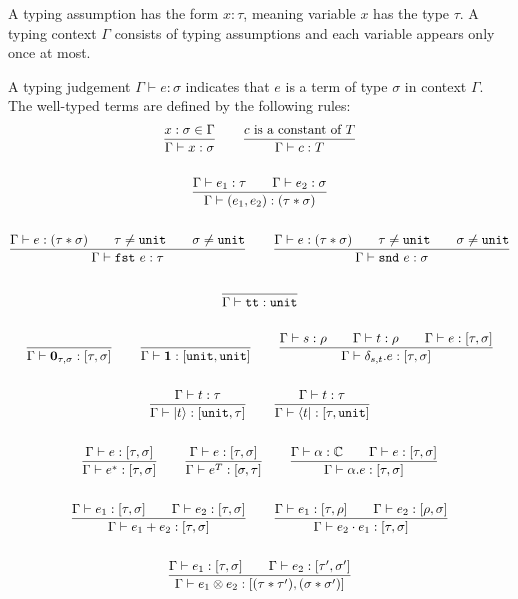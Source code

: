 \begin{definition}
  A typing assumption has the form $x : \tau$, meaning variable $x$ has the type $\tau$. A typing context $\Gamma$ consists of typing assumptions and each variable appears only once at most.

  A typing judgement $\Gamma \vdash e : \sigma$ indicates that $e$ is a term of type $\sigma$ in context $\Gamma$. The well-typed terms are defined by the following rules:
  \begin{gather*}
    \frac{x : \sigma \in \Gamma}{\Gamma \vdash x : \sigma}
    \qquad \frac{c\ \textrm{is a constant of}\ T}{\Gamma \vdash c : T}\\
    \\
    \frac{\Gamma \vdash e_1 : \tau \qquad \Gamma \vdash e_2 : \sigma}{\Gamma \vdash (e_1, e_2) : ( \tau * \sigma )} \\
    \\
    \frac{\Gamma \vdash e : ( \tau * \sigma ) \qquad \tau \neq \texttt{unit} \qquad \sigma \neq \texttt{unit}}{\Gamma \vdash \texttt{fst}\ e : \tau}
    \qquad
    \frac{\Gamma \vdash e : ( \tau * \sigma ) \qquad \tau \neq \texttt{unit} \qquad \sigma \neq \texttt{unit}}{\Gamma \vdash \texttt{snd}\ e : \sigma} \\
    \\
    \frac{}{\Gamma \vdash \texttt{tt} : \texttt{unit}}\\
    \ \\
    \frac{}{\Gamma \vdash \mathbf{0}_{\tau, \sigma} : [\tau, \sigma]}
    \qquad
    \frac{}{\Gamma \vdash \mathbf{1} : [\texttt{unit}, \texttt{unit}]}
    \qquad
    \frac{\Gamma \vdash s : \rho \qquad \Gamma \vdash t : \rho \qquad \Gamma \vdash e : [\tau, \sigma]}{\Gamma \vdash \delta_{s, t}.e : [\tau, \sigma]}\\
    \ \\
    \frac{\Gamma \vdash t : \tau}{\Gamma \vdash |t\rangle : [\texttt{unit}, \tau]}
    \qquad 
    \frac{\Gamma \vdash t : \tau}{\Gamma \vdash \langle t| : [\tau, \texttt{unit}]}\\
    \ \\
    \frac{\Gamma \vdash e : [\tau, \sigma]}{\Gamma \vdash e^* : [\tau, \sigma]}
    \qquad
    \frac{\Gamma \vdash e : [\tau, \sigma]}{\Gamma \vdash e^T : [\sigma, \tau]} 
    \qquad
    \frac{\Gamma \vdash \alpha : \mathbb{C} \qquad \Gamma \vdash e : [\tau, \sigma]}{\Gamma \vdash \alpha.e : [\tau, \sigma]}\\
    \ \\
    \frac{\Gamma \vdash e_1 : [\tau, \sigma] \qquad \Gamma \vdash e_2 : [\tau, \sigma] }{\Gamma \vdash e_1 + e_2 : [\tau, \sigma] }
    \qquad 
    \frac{\Gamma \vdash e_1 : [\tau, \rho] \qquad \Gamma \vdash e_2 : [\rho, \sigma] }{\Gamma \vdash e_2 \cdot e_1 : [\tau, \sigma] } \\
    \ \\
    \frac{\Gamma \vdash e_1 : [\tau, \sigma] \qquad \Gamma \vdash e_2 : [\tau', \sigma'] }{\Gamma \vdash e_1 \otimes e_2 : [(\tau * \tau'), (\sigma * \sigma')]}
  \end{gather*}
\end{definition}


